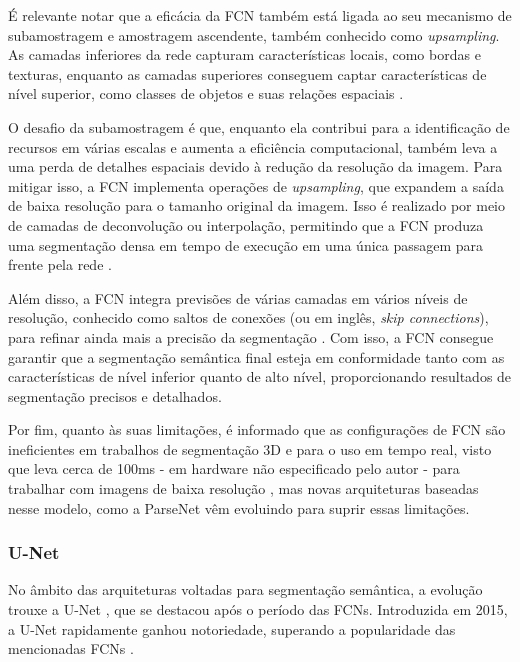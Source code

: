 É relevante notar que a eficácia da FCN também está ligada ao seu mecanismo de subamostragem e amostragem ascendente, também conhecido como \textit{upsampling}. As camadas inferiores da rede capturam características locais, como bordas e texturas, enquanto as camadas superiores conseguem captar características de nível superior, como classes de objetos e suas relações espaciais \citep{Shelhamer2016}.

O desafio da subamostragem é que, enquanto ela contribui para a identificação de recursos em várias escalas e aumenta a eficiência computacional, também leva a uma perda de detalhes espaciais devido à redução da resolução da imagem. Para mitigar isso, a FCN implementa operações de \textit{upsampling}, que expandem a saída de baixa resolução para o tamanho original da imagem. Isso é realizado por meio de camadas de deconvolução ou interpolação, permitindo que a FCN produza uma segmentação densa em tempo de execução em uma única passagem para frente pela rede \citep{Shelhamer2016}.

Além disso, a FCN integra previsões de várias camadas em vários níveis de resolução, conhecido como saltos de conexões (ou em inglês, \textit{skip connections}), para refinar ainda mais a precisão da segmentação \citep{Minaee2021}. Com isso, a FCN consegue garantir que a segmentação semântica final esteja em conformidade tanto com as características de nível inferior quanto de alto nível, proporcionando resultados de segmentação precisos e detalhados.

Por fim, quanto às suas limitações, é informado que as configurações de FCN são ineficientes em trabalhos de segmentação 3D e para o uso em tempo real, visto que leva cerca de 100ms - em hardware não especificado pelo autor - para trabalhar com imagens de baixa resolução \citep{Minaee2021}, mas novas arquiteturas baseadas nesse modelo, como a ParseNet \citep{Liu2015} vêm evoluindo para suprir essas limitações.

\subsubsection{U-Net}
\label{semantic:unet}
No âmbito das arquiteturas voltadas para segmentação semântica, a evolução trouxe a U-Net \citep{Ronneberger2015U-net:Segmentation}, que se destacou após o período das FCNs. Introduzida em 2015, a U-Net rapidamente ganhou notoriedade, superando a popularidade das mencionadas FCNs \citep{Sultana2020EvolutionSurvey}.

